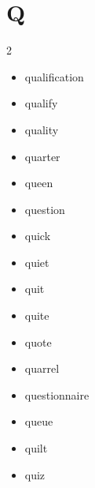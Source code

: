 \documentclass[../../book.tex]{subfiles}
\begin{document}
\section{Q}
\raggedcolumns
\begin{multicols}{2}
\begin{itemize}
\item[-] qualification
\item[-] qualify
\item[-] quality
\item[-] quarter
\item[-] queen
\item[-] question
\item[-] quick
\item[-] quiet
\item[-] quit
\item[-] quite
\item[-] quote
\item[-] quarrel
\item[-] questionnaire
\item[-] queue
\item[-] quilt
\item[-] quiz
\end{itemize}
\end{multicols}
\end{document}

